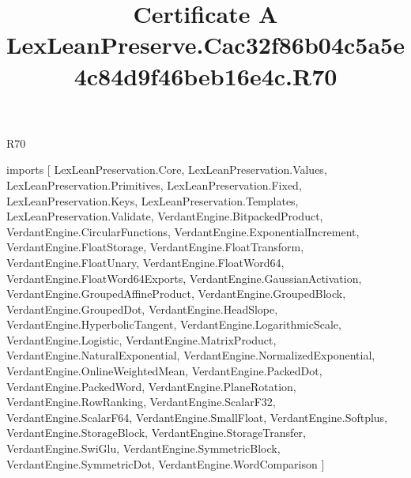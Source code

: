 \begin{lexlean}{R70}
\title{Certificate A LexLeanPreserve.Cac32f86b04c5a5e4c84d9f46beb16e4c.R70}
\begin{coremodule}
imports [
  LexLeanPreservation.Core,
  LexLeanPreservation.Values,
  LexLeanPreservation.Primitives,
  LexLeanPreservation.Fixed,
  LexLeanPreservation.Keys,
  LexLeanPreservation.Templates,
  LexLeanPreservation.Validate,
  VerdantEngine.BitpackedProduct,
  VerdantEngine.CircularFunctions,
  VerdantEngine.ExponentialIncrement,
  VerdantEngine.FloatStorage,
  VerdantEngine.FloatTransform,
  VerdantEngine.FloatUnary,
  VerdantEngine.FloatWord64,
  VerdantEngine.FloatWord64Exports,
  VerdantEngine.GaussianActivation,
  VerdantEngine.GroupedAffineProduct,
  VerdantEngine.GroupedBlock,
  VerdantEngine.GroupedDot,
  VerdantEngine.HeadSlope,
  VerdantEngine.HyperbolicTangent,
  VerdantEngine.LogarithmicScale,
  VerdantEngine.Logistic,
  VerdantEngine.MatrixProduct,
  VerdantEngine.NaturalExponential,
  VerdantEngine.NormalizedExponential,
  VerdantEngine.OnlineWeightedMean,
  VerdantEngine.PackedDot,
  VerdantEngine.PackedWord,
  VerdantEngine.PlaneRotation,
  VerdantEngine.RowRanking,
  VerdantEngine.ScalarF32,
  VerdantEngine.ScalarF64,
  VerdantEngine.SmallFloat,
  VerdantEngine.Softplus,
  VerdantEngine.StorageBlock,
  VerdantEngine.StorageTransfer,
  VerdantEngine.SwiGlu,
  VerdantEngine.SymmetricBlock,
  VerdantEngine.SymmetricDot,
  VerdantEngine.WordComparison
]


\end{coremodule}
\end{lexlean}
